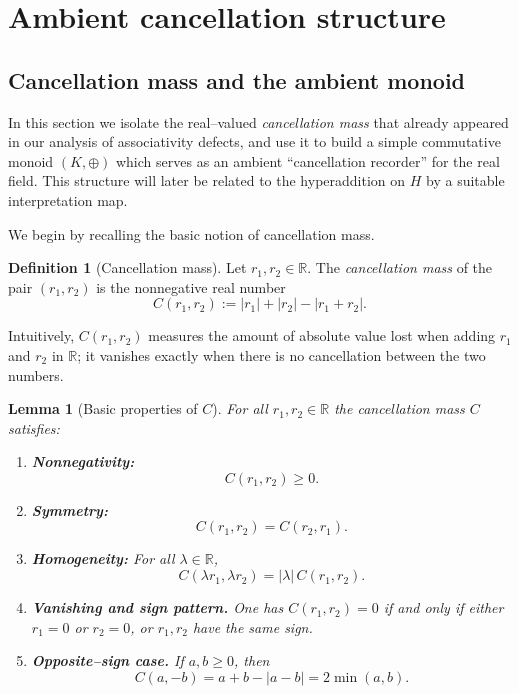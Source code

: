 \documentclass[11pt]{amsart}
\numberwithin{equation}{section}
\newtheorem{lemma}[theorem]{Lemma}
\theoremstyle{definition}
\newtheorem{definition}[theorem]{Definition}
\theoremstyle{remark}
\newcommand{\R}{\mathbb{R}}
\newcommand{\Hnum}{H}                      %
\newcommand{\Kamb}{K}                      %
\newcommand{\Cfun}{C}                      %
\begin{document}

\section{Ambient cancellation structure}
\label{sec:ambient}


\subsection{Cancellation mass and the ambient monoid}
\label{subsec:ambient-monoid}

In this section we isolate the real--valued \emph{cancellation mass}
that already appeared in our analysis of associativity defects, and use
it to build a simple commutative monoid $(\Kamb,\oplus)$ which serves
as an ambient ``cancellation recorder'' for the real field.  This
structure will later be related to the hyperaddition on $\Hnum$ by a
suitable interpretation map.

\medskip

We begin by recalling the basic notion of cancellation mass.

\begin{definition}[Cancellation mass]\label{def:cancellation-mass}
Let $r_1,r_2\in\R$.  The \emph{cancellation mass} of the pair
$(r_1,r_2)$ is the nonnegative real number
\[
  \Cfun(r_1,r_2)
  := |r_1| + |r_2| - |r_1 + r_2|.
\]
\end{definition}

Intuitively, $\Cfun(r_1,r_2)$ measures the amount of absolute value
lost when adding $r_1$ and $r_2$ in $\R$; it vanishes exactly when
there is no cancellation between the two numbers.

\begin{lemma}[Basic properties of $\Cfun$]\label{lem:C-basic}
For all $r_1,r_2\in\R$ the cancellation mass $\Cfun$ satisfies:
\begin{enumerate}
  \item \textbf{Nonnegativity:}
  \[
    \Cfun(r_1,r_2)\ge 0.
  \]
  \item \textbf{Symmetry:}
  \[
    \Cfun(r_1,r_2) = \Cfun(r_2,r_1).
  \]
  \item \textbf{Homogeneity:} For all $\lambda\in\R$,
  \[
    \Cfun(\lambda r_1,\lambda r_2)
    = |\lambda|\,\Cfun(r_1,r_2).
  \]
  \item \textbf{Vanishing and sign pattern.}
        One has $\Cfun(r_1,r_2)=0$ if and only if either
        $r_1=0$ or $r_2=0$, or $r_1,r_2$ have the same sign.
  \item \textbf{Opposite--sign case.}
        If $a,b\ge 0$, then
        \[
          \Cfun(a,-b) = a+b-|a-b| = 2\min(a,b).
        \]
\end{enumerate}
\end{lemma}
\end{document}
